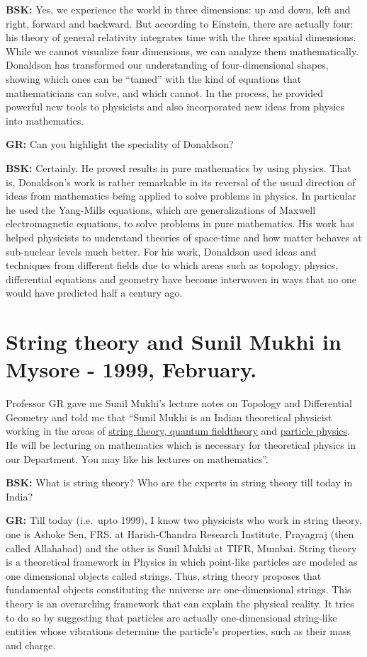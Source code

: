 \textbf{BSK:}  Yes, we experience the world in three dimensions: up and down, left and right, forward and backward. But according to Einstein, there are actually four: his theory of general relativity integrates time with the three spatial dimensions. While we cannot visualize four dimensions, we can analyze them mathematically. Donaldson has transformed our understanding of four-dimensional shapes, showing which ones can be “tamed” with the kind of equations that mathematicians can solve, and which cannot. In the process, he provided powerful new tools to physicists and also incorporated new ideas from physics into mathematics.

\textbf{GR:} Can you highlight the speciality of Donaldson?

\textbf{BSK:} Certainly. He proved results in pure mathematics by using physics. That is, Donaldson’s work is rather remarkable in its reversal of the usual direction of ideas from mathematics being applied to solve problems in physics. In particular he used the Yang-Mills equations, which are generalizations of Maxwell electromagnetic equations, to solve problems in pure mathematics.  His work has helped physicists to understand theories of space-time and how matter behaves at sub-nuclear levels much better. For his work, Donaldson used ideas and techniques from different fields due to which areas such as topology, physics, differential equations and geometry have become interwoven in ways that no one would have predicted half a century ago.

\section*{String theory and Sunil Mukhi in\\ Mysore - 1999, February.}

Professor GR gave me Sunil Mukhi’s lecture notes on Topology and Differential Geometry and told me that “Sunil Mukhi is an Indian theoretical physicist working in the areas of \underline{string theory, quantum field}\break \underline{theory} and \underline{particle physics}. He will be lecturing on mathematics which is necessary for theoretical physics in our Department. You may like his lectures on mathematics”.

\textbf{BSK:} What is string theory? Who are the experts in string theory till today in India?

\textbf{GR:} Till today (i.e.\ upto 1999), I know two physicists who work in string theory, one is Ashoke Sen, FRS, at Harish-Chandra Research Institute, Prayagraj (then called Allahabad) and the other is Sunil Mukhi at TIFR, Mumbai. String theory is a theoretical framework in Physics in which point-like particles are modeled as one dimensional objects called strings. Thus, string theory proposes that fundamental objects constituting the universe are one-dimensional strings. This theory is an overarching framework that can explain the physical reality. It tries to do so by suggesting that particles are actually one-dimensional string-like entities whose vibrations determine the particle’s properties, such as their mass and charge.

